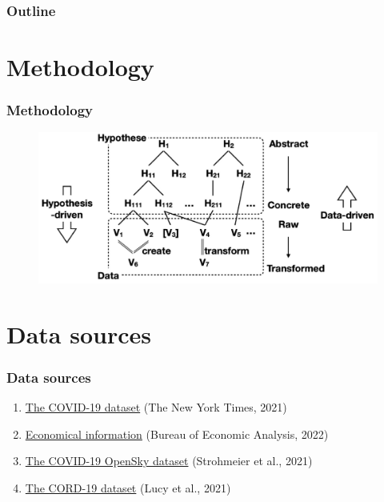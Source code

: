 \documentclass{beamer}
\title{}
\subtitle{COVID-19 analysis}
\author{Sebastiaan Van den Broeck}
\institute{KUL}
\date{28/08/2022}
\begin{document}
\begin{frame}
\titlepage
\end{frame}

\begin{frame}
\frametitle{Outline}
\tableofcontents
\end{frame}

\section{Methodology}
\begin{frame}
\frametitle{Methodology}

\begin{figure}
\centering
\includegraphics[width=0.8\linewidth]{../visualizations/hypothesis_space_data_space.png}
\end{figure}

\end{frame}

\section{Data sources}
\begin{frame}
\frametitle{Data sources}

\begin{enumerate}
\item \href{https://github.com/nytimes/covid-19-data}{The COVID-19 dataset} \hfill (The New York Times, 2021)
\item \href{https://apps.bea.gov/regional/downloadzip.cfm}{Economical information} \hfill (Bureau of Economic Analysis, 2022)
\item \href{https://zenodo.org/record/6411336\#.YvUG14VBzCl}{The COVID-19 OpenSky dataset} \hfill (Strohmeier et al., 2021)
\item \href{https://github.com/allenai/cord19}{The CORD-19 dataset} \hfill (Lucy et al., 2021)
\end{enumerate}

\end{frame}
\end{document}

